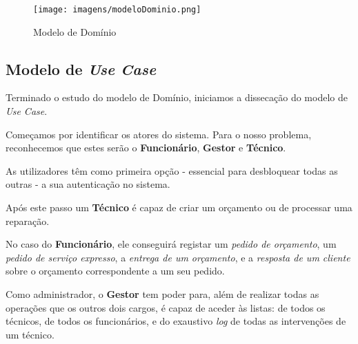 \documentclass{article}
\begin{document}
\begin{figure}[H]
    \centering
    \texttt{[image: imagens/modeloDominio.png]}
    \caption{Modelo de Domínio}
\end{figure}

\subsection{Modelo de \textit{Use Case}}

Terminado o estudo do modelo de Domínio, iniciamos a dissecação do modelo de \textit{Use Case}.
\par Começamos por identificar os atores do sistema. Para o nosso problema, reconhecemos que estes serão o \textbf{Funcionário}, \textbf{Gestor} e \textbf{Técnico}.
\par As utilizadores têm como primeira opção - essencial para desbloquear todas as outras - a sua autenticação no sistema.
\par Após este passo um \textbf{Técnico} é capaz de criar um orçamento ou de processar uma reparação.
\par No caso do \textbf{Funcionário}, ele conseguirá registar um \textit{pedido de orçamento}, um \textit{pedido de serviço expresso}, a \textit{entrega de um orçamento}, e a\textit{ resposta de um cliente} sobre o orçamento correspondente a um seu pedido.
\par Como administrador, o \textbf{Gestor} tem poder para, além de realizar todas as operações que os outros dois cargos, é capaz de aceder às listas: de todos os técnicos, de todos os funcionários, e do exaustivo \textit{log} de todas as intervenções de um técnico. 
\end{document}

